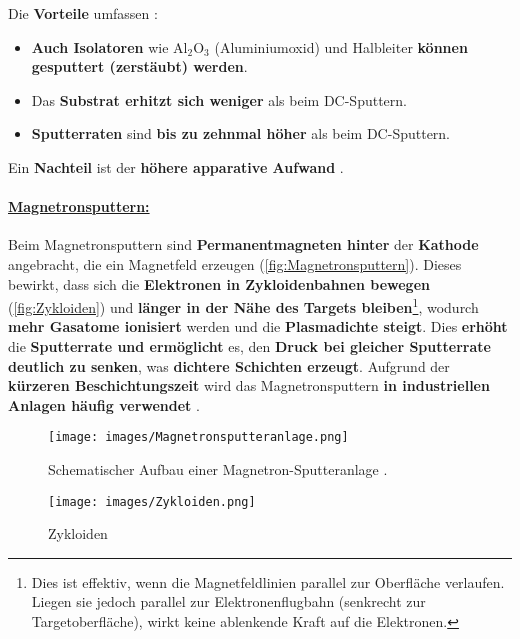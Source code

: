 \documentclass{article} %
\begin{document}
Die \textbf{Vorteile} umfassen \cite{keplinger2024}:

\begin{itemize}
    \item \textbf{Auch Isolatoren} wie \( \mathrm{Al}_2\mathrm{O}_3 \) (Aluminiumoxid) und Halbleiter \textbf{können gesputtert (zerstäubt) werden}.
    \item Das \textbf{Substrat erhitzt sich weniger} als beim DC-Sputtern.
    \item \textbf{Sputterraten} sind \textbf{bis zu zehnmal höher} als beim DC-Sputtern.
\end{itemize}

Ein \textbf{Nachteil} ist der \textbf{höhere apparative Aufwand} \cite{keplinger2024}.

\vspace{1em}
\paragraph{\uline{Magnetronsputtern:}} Beim Magnetronsputtern sind \textbf{Permanentmagneten hinter} der \textbf{Kathode} angebracht, die ein Magnetfeld erzeugen 
(\autoref{fig:Magnetronsputtern}). Dieses bewirkt, dass sich die \textbf{Elektronen in Zykloidenbahnen bewegen} (\autoref{fig:Zykloiden}) und \textbf{länger in der 
Nähe des Targets bleiben}\footnote{Dies ist effektiv, wenn die Magnetfeldlinien parallel zur Oberfläche verlaufen. Liegen sie jedoch parallel zur 
Elektronenflugbahn (senkrecht zur Targetoberfläche), wirkt keine ablenkende Kraft auf die Elektronen.}, wodurch \textbf{mehr Gasatome ionisiert} werden und die 
\textbf{Plasmadichte steigt}. Dies \textbf{erhöht} die \textbf{Sputterrate und ermöglicht} es, den \textbf{Druck bei gleicher Sputterrate deutlich zu senken}, was 
\textbf{dichtere Schichten erzeugt}. Aufgrund der \textbf{kürzeren Beschichtungszeit} wird das Magnetronsputtern \textbf{in industriellen Anlagen häufig 
verwendet} \cite{kittel2004}. \\

\begin{figure}[htb!]
    \centering
    \texttt{[image: images/Magnetronsputteranlage.png]} %
    \captionsetup{labelfont=bf} %
    \caption{Schematischer Aufbau einer Magnetron-Sputteranlage \cite{keplinger2024}.}
    \label{fig:Magnetronsputtern}
\end{figure}

\begin{figure}[htb!]
    \centering
    \texttt{[image: images/Zykloiden.png]} %
    \captionsetup{labelfont=bf} %
    \caption{Zykloiden}
    \label{fig:Zykloiden}
\end{figure}
\end{document}
